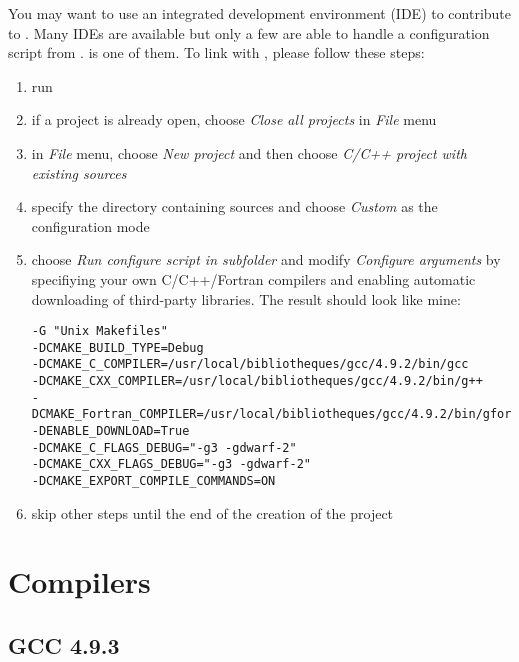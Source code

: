 You may want to use an integrated development environment (IDE) to contribute to \Simol. Many IDEs are available but only a few are able to handle a configuration script from \CMake. \Netbeans is one of them. To link \Netbeans with \Simol, please follow these steps:
\begin{enumerate}
\item run \Netbeans
\item if a project is already open, choose \textit{Close all projects} in \textit{File} menu
\item in \textit{File} menu, choose \textit{New project} and then choose \textit{C/C++ project with existing sources}
\item specify the directory containing \Simol sources and choose \textit{Custom} as the configuration mode
\item choose \textit{Run configure script in subfolder} and modify \textit{Configure arguments} by specifiying your own C/C++/Fortran compilers and enabling automatic downloading of third-party libraries. The result should look like mine:
\begin{verbatim}
-G "Unix Makefiles" 
-DCMAKE_BUILD_TYPE=Debug 
-DCMAKE_C_COMPILER=/usr/local/bibliotheques/gcc/4.9.2/bin/gcc 
-DCMAKE_CXX_COMPILER=/usr/local/bibliotheques/gcc/4.9.2/bin/g++ 
-DCMAKE_Fortran_COMPILER=/usr/local/bibliotheques/gcc/4.9.2/bin/gfortran 
-DENABLE_DOWNLOAD=True 
-DCMAKE_C_FLAGS_DEBUG="-g3 -gdwarf-2" 
-DCMAKE_CXX_FLAGS_DEBUG="-g3 -gdwarf-2" 
-DCMAKE_EXPORT_COMPILE_COMMANDS=ON
\end{verbatim}
\item skip other steps until the end of the creation of the project
\end{enumerate}



\section{Compilers}

\subsection{GCC 4.9.3}

